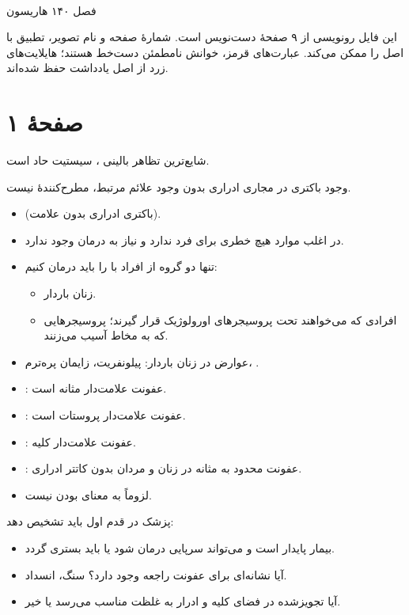 \begin{center}
{\Large\bfseries {}}\\[4pt]
فصل ۱۴۰ هاریسون
\end{center}
\begingroup\small
این فایل رونویسی از ۹ صفحهٔ دست‌نویس است. شمارهٔ صفحه و نام تصویر، تطبیق با اصل را ممکن می‌کند. عبارت‌های قرمز، خوانش نامطمئن دست‌خط هستند؛ هایلایت‌های زرد از اصل یادداشت حفظ شده‌اند.
\endgroup
\section*{صفحهٔ ۱}
{\footnotesize{}}

شایع‌ترین تظاهر بالینی ، سیستیت حاد است.

وجود باکتری در مجاری ادراری بدون وجود علائم مرتبط، مطرح‌کنندهٔ  نیست.
\begin{itemize}
\item {} (باکتری ادراری بدون علامت).
\item {} در اغلب موارد هیچ خطری برای فرد ندارد و نیاز به درمان وجود ندارد.
\item تنها دو گروه از افراد با  را باید درمان کنیم:
\begin{itemize}
\item زنان باردار.
\item افرادی که می‌خواهند تحت پروسیجرهای اورولوژیک قرار گیرند؛ پروسیجرهایی که به مخاط آسیب می‌زنند.
\end{itemize}
\item عوارض  در زنان باردار: پیلونفریت، زایمان پره‌ترم، .
\end{itemize}

\begin{itemize}
\item {}: عفونت علامت‌دار مثانه است.
\item {}: عفونت علامت‌دار پروستات است. %
\item {}: عفونت علامت‌دار کلیه.
\item {}: عفونت محدود به مثانه در زنان و مردان بدون کاتتر ادراری.
\item {} لزوماً به معنای  بودن نیست.
\end{itemize}

پزشک در قدم اول باید تشخیص دهد:
\begin{itemize}
\item بیمار پایدار است و می‌تواند سرپایی درمان شود یا باید بستری گردد.
\item آیا نشانه‌ای برای عفونت راجعه وجود دارد؟ سنگ، انسداد.
\item آیا  تجویز‌شده در فضای کلیه و ادرار به غلظت مناسب می‌رسد یا خیر.
\end{itemize}

